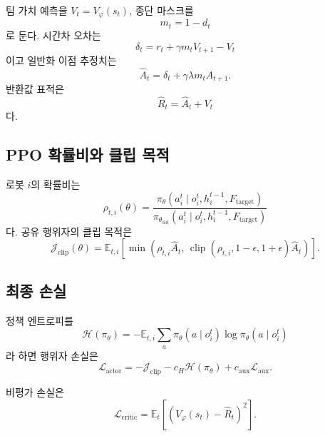 \documentclass[11pt,a4paper]{article}
\newcommand{\Ftarget}{F_{\mathrm{target}}}
\newcommand{\clip}{\operatorname{clip}}
\begin{document}
팀 가치 예측을 \(V_t=V_\varphi(s_t)\), 종단 마스크를
\begin{equation}
  m_t=1-d_t
\end{equation}
로 둔다. 시간차 오차는
\begin{equation}
  \delta_t=
  r_t+\gamma m_tV_{t+1}-V_t
\end{equation}
이고 일반화 이점 추정치는
\begin{equation}
  \widehat A_t=
  \delta_t+
  \gamma\lambda m_t\widehat A_{t+1}.
  \label{eq:gae}
\end{equation}
반환값 표적은
\begin{equation}
  \widehat R_t=\widehat A_t+V_t
\end{equation}
다.

\subsection{PPO 확률비와 클립 목적}

로봇 \(i\)의 확률비는
\begin{equation}
  \rho_{t,i}(\theta)=
  \frac{
    \pi_\theta(a_i^t\mid o_i^t,h_i^{t-1},\Ftarget)
  }{
    \pi_{\theta_{\mathrm{old}}}
    (a_i^t\mid o_i^t,h_i^{t-1},\Ftarget)
  }
  \label{eq:probability-ratio}
\end{equation}
다. 공유 행위자의 클립 목적은
\begin{equation}
  \mathcal{J}_{\mathrm{clip}}(\theta)=
  \mathbb{E}_{t,i}\left[
    \min\left(
      \rho_{t,i}\widehat A_t,\,
      \clip(\rho_{t,i},1-\epsilon,1+\epsilon)\widehat A_t
    \right)
  \right].
  \label{eq:ppo-clip}
\end{equation}

\subsection{최종 손실}

정책 엔트로피를
\begin{equation}
  \mathcal{H}(\pi_\theta)=
  -\mathbb{E}_{t,i}
  \sum_a\pi_\theta(a\mid o_i^t)
  \log\pi_\theta(a\mid o_i^t)
\end{equation}
라 하면 행위자 손실은
\begin{equation}
  \mathcal{L}_{\mathrm{actor}}=
  -\mathcal{J}_{\mathrm{clip}}
  -c_H\mathcal{H}(\pi_\theta)
  +c_{\mathrm{aux}}\mathcal{L}_{\mathrm{aux}}.
  \label{eq:actor-loss}
\end{equation}

비평가 손실은
\begin{equation}
  \mathcal{L}_{\mathrm{critic}}=
  \mathbb{E}_t
  \left[
    \left(
      V_\varphi(s_t)-\widehat R_t
    \right)^2
  \right].
  \label{eq:critic-loss}
\end{equation}
\end{document}
